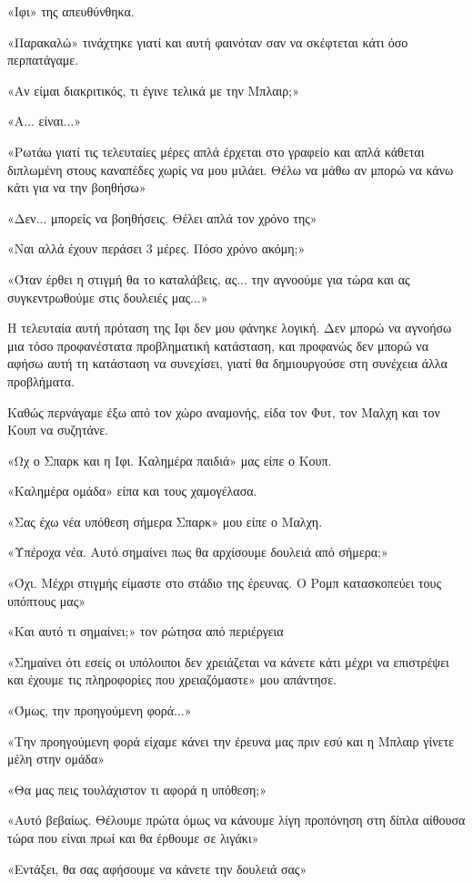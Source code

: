 \documentclass[12pt,twoside, openany]{book}
\begin{document}
«Ιφι» της απευθύνθηκα.

«Παρακαλώ» τινάχτηκε γιατί και αυτή φαινόταν σαν να σκέφτεται κάτι όσο περπατάγαμε.

«Αν είμαι διακριτικός, τι έγινε τελικά με την Μπλαιρ;»

«Α... είναι...»

«Ρωτάω γιατί τις τελευταίες μέρες απλά έρχεται στο γραφείο και απλά κάθεται διπλωμένη στους καναπέδες χωρίς να μου μιλάει. Θέλω να μάθω αν μπορώ να κάνω κάτι για να την βοηθήσω»

«Δεν... μπορείς να βοηθήσεις. Θέλει απλά τον χρόνο της»

«Ναι αλλά έχουν περάσει 3 μέρες. Πόσο χρόνο ακόμη;»

«Όταν έρθει η στιγμή θα το καταλάβεις, ας... την αγνοούμε για τώρα και ας συγκεντρωθούμε στις δουλειές μας...»

Η τελευταία αυτή πρόταση της Ιφι δεν μου φάνηκε λογική. Δεν μπορώ να αγνοήσω μια τόσο προφανέστατα προβληματική κατάσταση, και προφανώς δεν μπορώ να αφήσω αυτή τη κατάσταση να συνεχίσει, γιατί θα δημιουργούσε στη συνέχεια άλλα προβλήματα.

Καθώς περνάγαμε έξω από τον χώρο αναμονής, είδα τον Φυτ, τον Μαλχη και τον Κουπ να συζητάνε.

«Ωχ ο Σπαρκ και η Ιφι. Καλημέρα παιδιά» μας είπε ο Κουπ.

«Καλημέρα ομάδα» είπα και τους χαμογέλασα.

«Σας έχω νέα υπόθεση σήμερα Σπαρκ» μου είπε ο Μαλχη.

«Υπέροχα νέα. Αυτό σημαίνει πως θα αρχίσουμε δουλειά από σήμερα;»

«Όχι. Μέχρι στιγμής είμαστε στο στάδιο της έρευνας. Ο Ρομπ κατασκοπεύει τους υπόπτους μας»

«Και αυτό τι σημαίνει;» τον ρώτησα από περιέργεια

«Σημαίνει ότι εσείς οι υπόλοιποι δεν χρειάζεται να κάνετε κάτι μέχρι να επιστρέψει και έχουμε τις πληροφορίες που χρειαζόμαστε» μου απάντησε.

«Όμως, την προηγούμενη φορά...»

«Την προηγούμενη φορά είχαμε κάνει την έρευνα μας πριν εσύ και η Μπλαιρ γίνετε μέλη στην ομάδα»

«Θα μας πεις τουλάχιστον τι αφορά η υπόθεση;»

«Αυτό βεβαίως. Θέλουμε πρώτα όμως να κάνουμε λίγη προπόνηση στη δίπλα αίθουσα τώρα που είναι πρωί και θα έρθουμε σε λιγάκι»

«Εντάξει, θα σας αφήσουμε να κάνετε την δουλειά σας»
\end{document}
